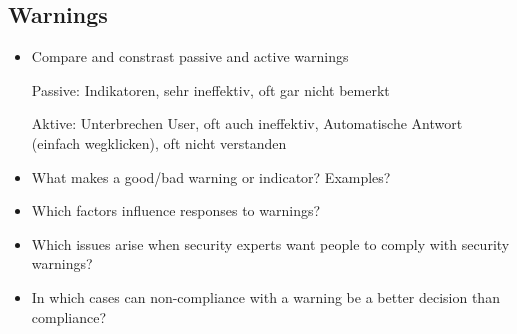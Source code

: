 \subsection{Warnings}
\begin{itemize}
	\item
		Compare and constrast passive and active warnings

		Passive: Indikatoren, sehr ineffektiv, oft gar nicht bemerkt

		Aktive: Unterbrechen User, oft auch ineffektiv, Automatische Antwort (einfach wegklicken), oft nicht verstanden
	\item
		What makes a good/bad warning or indicator? Examples?
	\item
		Which factors influence responses to warnings?
	\item
		Which issues arise when security experts want people to comply with security warnings?
	\item
		In which cases can non-compliance with a warning be a better decision than compliance?
\end{itemize}

